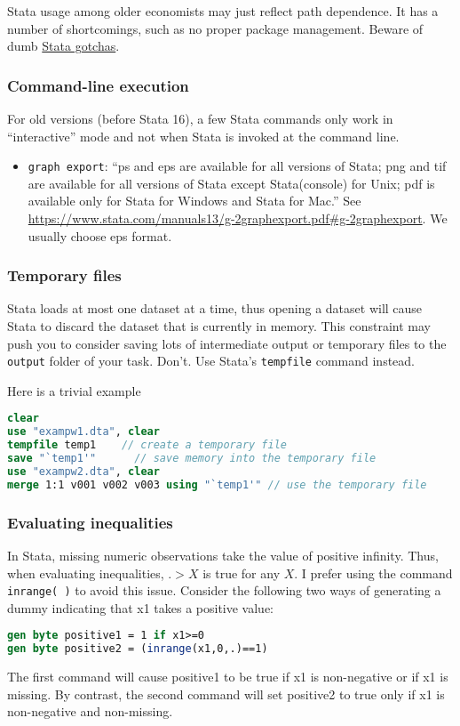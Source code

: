 Stata usage among older economists may just reflect path dependence.
It has a number of shortcomings, such as no proper package management.
Beware of dumb \href{https://ifs.org.uk/sites/default/files/output_url_files/stata_gotchasJan2014.pdf}{Stata gotchas}.

\subsubsection{Command-line execution}

For old versions (before Stata 16), a few Stata commands only work in ``interactive'' mode and not when Stata is invoked at the command line.
\begin{itemize}
	\item \texttt{graph export}: 
	``ps and eps are available for all versions of Stata; png and tif are available for all versions of Stata except Stata(console) for Unix; pdf is available only for Stata for Windows and Stata for Mac.''
	See \url{https://www.stata.com/manuals13/g-2graphexport.pdf#g-2graphexport}.
	We usually choose eps format.
\end{itemize}


\subsubsection{Temporary files}
Stata loads at most one dataset at a time, 
thus opening a dataset will cause Stata to discard the dataset that is currently in memory.
This constraint may push you to consider saving lots of intermediate output or temporary files to the \texttt{output} folder of your task.
Don't.
Use Stata's \texttt{tempfile} command instead.

Here is a trivial example
\begin{lstlisting}[language=Stata]
clear
use "exampw1.dta", clear
tempfile temp1    // create a temporary file
save "`temp1'"      // save memory into the temporary file
use "exampw2.dta", clear
merge 1:1 v001 v002 v003 using "`temp1'" // use the temporary file
\end{lstlisting}

\subsubsection{Evaluating inequalities}
In Stata, missing numeric observations take the value of positive infinity.
Thus, when evaluating inequalities, $.>X$ is true for any $X$.
I prefer using the command \texttt{inrange( )} to avoid this issue.
Consider the following two ways of generating a dummy indicating that x1 takes a positive value:
\begin{lstlisting}[language=Stata]
gen byte positive1 = 1 if x1>=0
gen byte positive2 = (inrange(x1,0,.)==1)
\end{lstlisting}
The first command will cause positive1 to be true if x1 is non-negative or if x1 is missing.
By contrast, the second command will set positive2 to true only if x1 is non-negative and non-missing.

